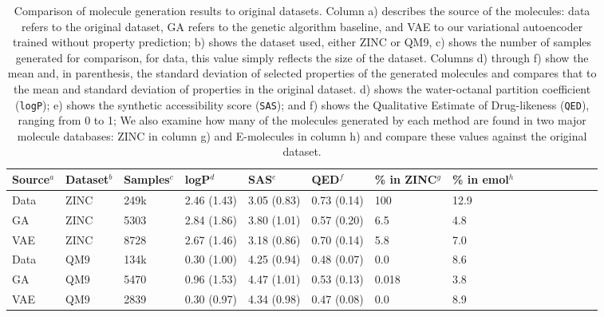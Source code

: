 \begin{table}[h]
\small
\centering
\begin{tabular}{lp{1cm}lp{1.3cm}lp{1cm}lp{1cm}lp{1cm}lp{0.6cm}lp{1cm}l}
\hline
  Source$^{a}$ & Dataset$^{b}$ &  Samples$^{c}$ &   logP$^{d}$ &      SAS$^{e}$  &   QED$^{f}$ & \% in ZINC$^{g}$ & \% in emol$^{h}$ \\
\hline
   Data &    ZINC &     249k &  2.46 (1.43) &  3.05 (0.83)  &  0.73 (0.14) & 100 & 12.9 \\
  GA &    ZINC &     5303 &  2.84 (1.86) &  3.80 (1.01) &  0.57 (0.20) &        6.5 &  4.8\\
    VAE &    ZINC &     8728 &  2.67 (1.46) &  3.18 (0.86) &  0.70 (0.14) &      5.8 & 7.0\\
\hline
Data &     QM9 &     134k &  0.30 (1.00) &  4.25 (0.94) &  0.48 (0.07)  &    0.0 & 8.6 \\
GA &     QM9 &     5470 &  0.96 (1.53) &  4.47 (1.01) &  0.53 (0.13)  &        0.018    & 3.8 \\
 VAE &     QM9 &     2839 &  0.30 (0.97) &  4.34 (0.98) &  0.47 (0.08) &        0.0  &  8.9\\
 \hline
 \end{tabular}
 \caption{
Comparison of molecule generation results to original datasets. Column a) describes the source of the molecules: data refers to the original dataset, GA refers to the genetic algorithm baseline, and VAE to our variational autoencoder trained without property prediction;  b) shows the dataset used, either ZINC or QM9, c) shows the number of samples generated for comparison, for data, this value simply reflects the size of the dataset.
Columns d) through f) show the mean and, in parenthesis, the standard deviation of selected properties of the generated molecules and compares that to the mean and standard deviation of properties in the original dataset.
 d) shows the water-octanal partition coefficient (\texttt{logP})\cite{wildman_1999_prediction}; e) shows the synthetic accessibility score (\texttt{SAS})\cite{Ertl2009estimation}; and f) shows the Qualitative Estimate of Drug-likeness (\texttt{QED})\cite{bickerton2012quantifying}, ranging from 0 to 1;
We also examine how many of the molecules generated by each method are found in two major molecule databases: ZINC in column g) and E-molecules\cite{emolecules} in column h) and compare these values against the original dataset.
}
\label{tab:zinc_gen_results}
 \end{table}

